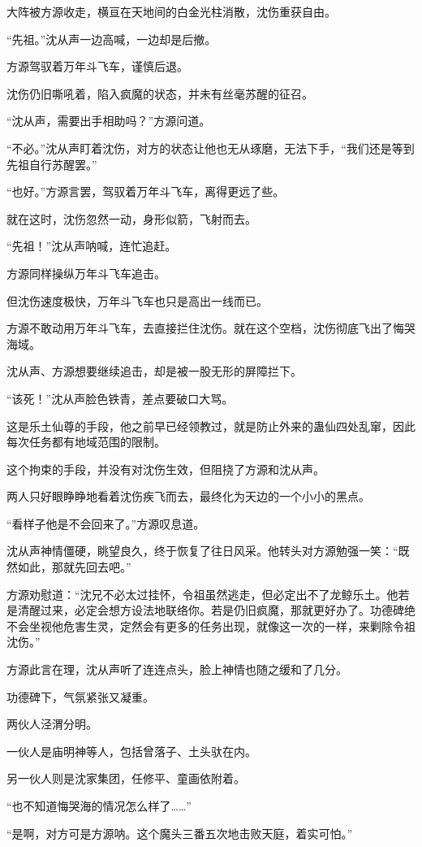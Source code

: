 \begin{this_body}
大阵被方源收走，横亘在天地间的白金光柱消散，沈伤重获自由。

“先祖。”沈从声一边高喊，一边却是后撤。

方源驾驭着万年斗飞车，谨慎后退。

沈伤仍旧嘶吼着，陷入疯魔的状态，并未有丝毫苏醒的征召。

“沈从声，需要出手相助吗？”方源问道。

“不必。”沈从声盯着沈伤，对方的状态让他也无从琢磨，无法下手，“我们还是等到先祖自行苏醒罢。”

“也好。”方源言罢，驾驭着万年斗飞车，离得更远了些。

就在这时，沈伤忽然一动，身形似箭，飞射而去。

“先祖！”沈从声呐喊，连忙追赶。

方源同样操纵万年斗飞车追击。

但沈伤速度极快，万年斗飞车也只是高出一线而已。

方源不敢动用万年斗飞车，去直接拦住沈伤。就在这个空档，沈伤彻底飞出了悔哭海域。

沈从声、方源想要继续追击，却是被一股无形的屏障拦下。

“该死！”沈从声脸色铁青，差点要破口大骂。

这是乐土仙尊的手段，他之前早已经领教过，就是防止外来的蛊仙四处乱窜，因此每次任务都有地域范围的限制。

这个拘束的手段，并没有对沈伤生效，但阻挠了方源和沈从声。

两人只好眼睁睁地看着沈伤疾飞而去，最终化为天边的一个小小的黑点。

“看样子他是不会回来了。”方源叹息道。

沈从声神情僵硬，眺望良久，终于恢复了往日风采。他转头对方源勉强一笑：“既然如此，那就先回去吧。”

方源劝慰道：“沈兄不必太过挂怀，令祖虽然逃走，但必定出不了龙鲸乐土。他若是清醒过来，必定会想方设法地联络你。若是仍旧疯魔，那就更好办了。功德碑绝不会坐视他危害生灵，定然会有更多的任务出现，就像这一次的一样，来剿除令祖沈伤。”

方源此言在理，沈从声听了连连点头，脸上神情也随之缓和了几分。

功德碑下，气氛紧张又凝重。

两伙人泾渭分明。

一伙人是庙明神等人，包括曾落子、土头驮在内。

另一伙人则是沈家集团，任修平、童画依附着。

“也不知道悔哭海的情况怎么样了……”

“是啊，对方可是方源呐。这个魔头三番五次地击败天庭，着实可怕。”


\end{this_body}
